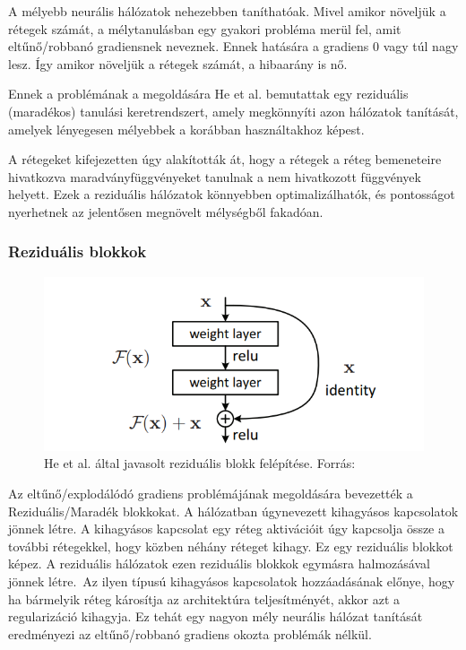 \documentclass[12pt,a4]{article}
\begin{document}
    A mélyebb neurális hálózatok nehezebben taníthatóak. Mivel amikor növeljük a rétegek számát, a mélytanulásban egy gyakori probléma merül fel, amit eltűnő/robbanó gradiensnek neveznek. Ennek hatására a gradiens 0 vagy túl nagy lesz. Így amikor növeljük a rétegek számát, a hibaarány is nő. 
    
    Ennek a problémának a megoldására He et al. \cite{resnet} bemutattak egy reziduális (maradékos) tanulási keretrendszert, amely megkönnyíti azon hálózatok tanítását, amelyek lényegesen mélyebbek a korábban használtakhoz képest. 

     A rétegeket kifejezetten úgy alakították át, hogy a rétegek a réteg bemeneteire hivatkozva maradványfüggvényeket tanulnak a nem hivatkozott függvények helyett. Ezek a reziduális hálózatok könnyebben optimalizálhatók, és pontosságot nyerhetnek az jelentősen megnövelt mélységből fakadóan.

    \newpage
    \subsubsection{Reziduális blokkok}
    
    
    \begin{figure}[h]	
 		\centering
 		\includegraphics[width=1\linewidth]{Residual-Block}
 		\caption{He et al. által javasolt reziduális blokk felépítése.
 			Forrás:\cite{resnet}}
        \label{fig:resblock}
 	\end{figure}
  
    Az eltűnő/explodálódó gradiens problémájának megoldására bevezették a Reziduális/Maradék blokkokat. A hálózatban úgynevezett kihagyásos kapcsolatok jönnek létre. A kihagyásos kapcsolat egy réteg aktivációit úgy kapcsolja össze a további rétegekkel, hogy közben néhány réteget kihagy. Ez egy reziduális blokkot képez. A reziduális hálózatok ezen reziduális blokkok egymásra halmozásával jönnek létre. Az ilyen típusú kihagyásos kapcsolatok hozzáadásának előnye, hogy ha bármelyik réteg károsítja az architektúra teljesítményét, akkor azt a regularizáció kihagyja. Ez tehát egy nagyon mély neurális hálózat tanítását eredményezi az eltűnő/robbanó gradiens okozta problémák nélkül. 
\end{document}
